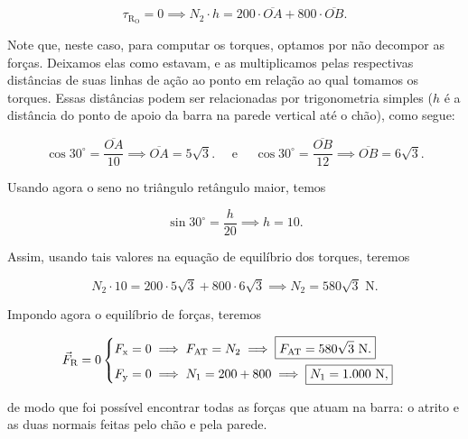 $$ \tau_{\text{R}_\text{O}} = 0 \implies N_2 \cdot h = 200 \cdot \overline{OA} + 800 \cdot \overline{OB}.$$

Note que, neste caso, para computar os torques, optamos por não decompor as forças. Deixamos elas como estavam, e as multiplicamos pelas respectivas distâncias de suas linhas de ação ao ponto em relação ao qual tomamos os torques. Essas distâncias podem ser relacionadas por trigonometria simples ($h$ é a distância do ponto de apoio da barra na parede vertical até o chão), como segue:

$$ \cos 30^\circ = \dfrac{\overline{OA}}{10} \implies \boxed{\overline{OA}= 5\sqrt 3.} \quad \text{ e } \quad \cos 30^\circ = \dfrac{\overline{OB}}{12} \implies \boxed{\overline{OB}= 6\sqrt 3.}$$

Usando agora o seno no triângulo retângulo maior, temos


$$ \sin 30^\circ = \dfrac{h}{20} \implies \boxed{h = 10.}$$

Assim, usando tais valores na equação de equilíbrio dos torques, teremos

$$  N_2 \cdot 10 = 200 \cdot 5 \sqrt 3 + 800 \cdot 6 \sqrt 3 \implies \boxed{N_2 =580 \sqrt 3 \text{ N.} }$$

Impondo agora o equilíbrio de forças, teremos

$$ \vec F_\text{R} = 0 \begin{cases}
    F_\text{x} = 0 \implies F_\text{AT} = N_2 \implies \boxed{F_\text{AT} =580 \sqrt 3 \text{ N.} }  \\   
    \rule{0pt}{1.5em} F_\text{y} = 0 \implies N_1 = 200 + 800 \implies \boxed{N_1 = 1.000 \text{ N} ,}\\
\end{cases}$$

\noindent de modo que foi possível encontrar todas as forças que atuam na barra: o atrito e as duas normais feitas pelo chão e pela parede.

\vspace{0.3cm}



